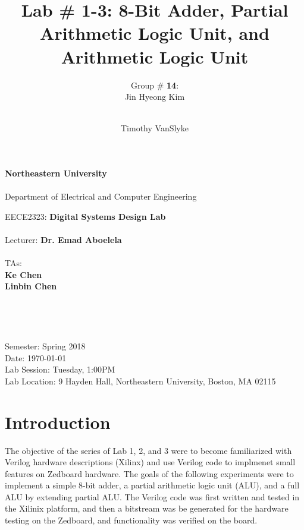 \documentclass[12pt, letterpaper]{article}
\title{Lab \# 1-3: \textbf{8-Bit Adder, Partial Arithmetic Logic Unit, and Arithmetic Logic Unit}}
\author{Group \# \textbf{14}:\\ Jin Hyeong Kim \and\\ Timothy VanSlyke}
\begin{document}
\begin{titlepage}
	\begin{center}
		{\Large
			\textbf{Northeastern University}\\
			~\\
			Department of Electrical and Computer Engineering\\ 
		}

		\vfill

		{\large
			EECE2323: \textbf{Digital Systems Design Lab}\\
			~\\
			Lecturer: \textbf{Dr. Emad Aboelela}\\
			~\\
			TAs:\\
			\textbf{Ke Chen}\\
			\textbf{Linbin Chen}\\
		}
	
		\vfill

		{\Large \thetitle}\\
	
		\vfill

		{\large \theauthor}\\

		\vfill

		{\large
			Semester: Spring 2018\\
			Date: \today\\
			Lab Session: Tuesday, 1:00PM\\ 
			Lab Location: 9 Hayden Hall, Northeastern University, Boston, MA 02115\\
		}

	\end{center}
\end{titlepage}

\hypersetup{linkcolor=black}
\tableofcontents
\hypersetup{linkcolor=cyan}

\newpage
\section{Introduction}
\begin{flushleft} 
\doublespacing The objective of the series of Lab 1, 2, and 3 were to become familiarized with Verilog hardware descriptions (Xilinx) and use Verilog code to implmenet small features on Zedboard hardware. The goals of the following experiments were to implement a simple 8-bit adder, a partial arithmetic logic unit (ALU), and a full ALU by extending partial ALU. The Verilog code was first written and tested in the Xilinix platform, and then a bitstream was be generated for the hardware testing on the Zedboard, and functionality was verified on the board.
\end{flushleft}
\end{document}
